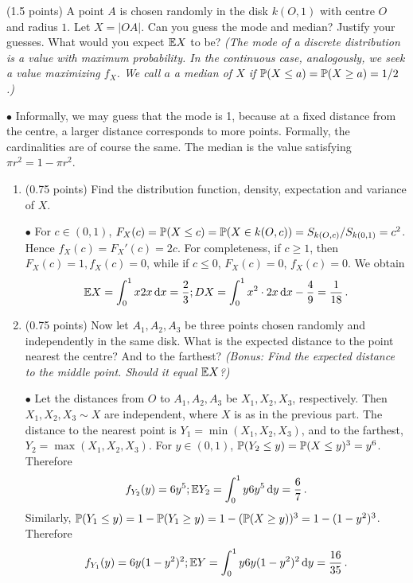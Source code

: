 \documentclass[a4paper]{report}
\begin{document}
\begin{problem}(1.5 points)
A point $A$ is chosen randomly in the disk $k(O,1)$ with centre $O$ and radius $1$. Let
$X=|OA|$. Can you guess
the mode and median? Justify your guesses. What would you expect $\E X$ to be?
\textit{(The mode of a discrete distribution is a value with maximum probability.
In the continuous case, analogously, we seek a value maximizing $f_X$.
We call $a$ a median of $X$ if $\P(X\leq a)=\P(X\geq a)=1/2$.)}

$\bullet$ Informally, we may guess that the mode is 1, because at a fixed
distance from the centre, a larger distance corresponds to more points.
Formally, the cardinalities are of course the same. The median is the value
satisfying $\pi r^2=1-\pi r^2$.
    \begin{enumerate}

    \item (0.75 points) Find the distribution function, density, expectation and
    variance of $X$.

$\bullet$ For $c\in(0,1)$, $F_X(c)=\P(X\leq c)=\P(X\in k(O,c))=S_{k(O,c)}/S_{k(0,1)}
=c^2$. Hence $f_X(c)=F_X'(c)=2c$. For completeness, if $c\geq1$, then $F_X(c)=1,
f_X(c)=0$, while if $c\leq0$, $F_X(c)=0$, $f_X(c)=0$.
We obtain
\[\E X = \int_0^1 x 2x \d x = \frac23; D X = \int_0^1 x^2 \cdot 2x \d x - \frac49= \frac{1}{18}\, . \]
    \item (0.75 points) Now let $A_1,A_2,A_3$ be three points chosen randomly
    and independently in the same disk. What is the expected distance to the point
    nearest the centre? And to the farthest? \textit{(Bonus: Find the expected
    distance to the middle point. Should it equal $\E X$?)}

$\bullet$
Let the distances from $O$ to $A_1,A_2,A_3$ be $X_1,X_2,X_3$, respectively. Then
$X_1,X_2,X_3\sim X$ are independent, where $X$ is as in the previous part.
The distance to the nearest point is $Y_1=\min(X_1,X_2,X_3)$, and to
the farthest, $Y_2=\max(X_1,X_2,X_3)$.
For $y\in(0,1)$,
$\P(Y_2\leq y)=\P(X\leq y)^3=y^6$. Therefore
\[
f_{Y_2}(y) = 6y^5; \E Y_2 = \int_0^1 y 6y^5 \d y = \frac67 \, .
\]
Similarly, $\P(Y_1\leq y)=1-\P(Y_1\geq y)=1-(\P(X\geq y))^3=
1-(1-y^2)^3$. Therefore
\[
f_{Y_1}(y) = 6y(1-y^2)^2; \E Y = \int_0^1 y 6y(1 - y^2)^2 \d y = \frac{16}{35} \, .
\]
\end{enumerate}
\end{problem}
\end{document}
